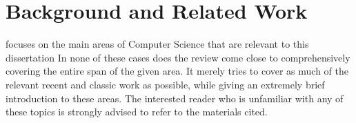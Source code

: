 \chapter{\label{chap:lr}Background and Related Work}
 focuses on the main areas of Computer Science that are relevant to this dissertation  In none of these cases does the review come close to comprehensively covering the entire span of the given area.  It merely tries to cover as much of the relevant recent and classic work as possible, while giving an extremely brief introduction to these areas.  The interested reader who is unfamiliar with any of these topics is strongly advised to refer to the materials cited.





% 